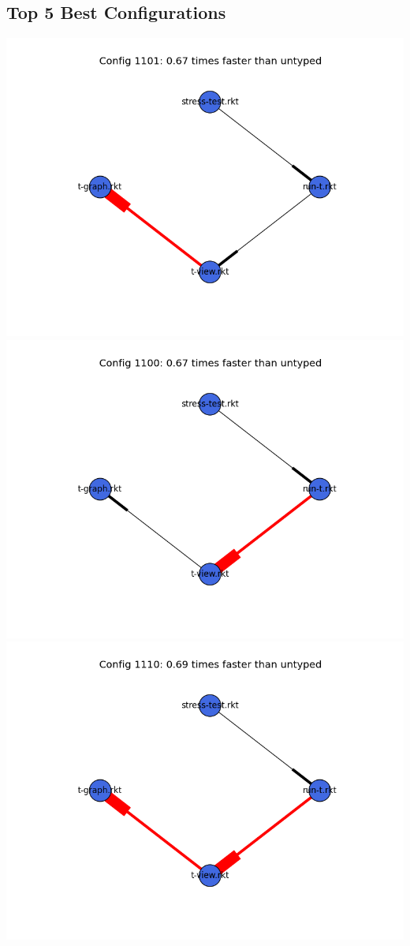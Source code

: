\documentclass{article}
\begin{document}
\begin{itemize}
\subsection{Top 5 Best Configurations}
\includegraphics[width=\textwidth]{mbta-base-module-graph-1101.png}
\includegraphics[width=\textwidth]{mbta-base-module-graph-1100.png}
\includegraphics[width=\textwidth]{mbta-base-module-graph-1110.png}

\end{itemize}
\end{document}
